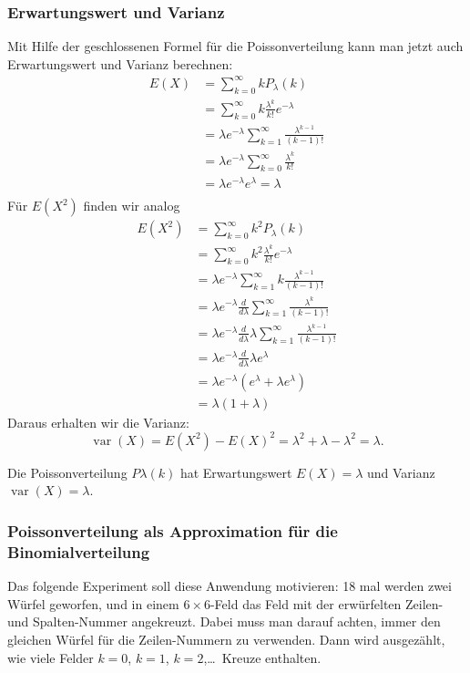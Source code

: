 \subsubsection{Erwartungswert und Varianz}
Mit Hilfe der geschlossenen Formel für die Poissonverteilung kann man
jetzt auch Erwartungswert und Varianz berechnen:
\begin{align*}
E(X)
&=\sum_{k=0}^\infty kP_\lambda(k)\\
&=\sum_{k=0}^\infty k\frac{\lambda^k}{k!}e^{-\lambda}\\
&=\lambda e^{-\lambda}\sum_{k=1}^\infty\frac{\lambda^{k-1}}{(k-1)!}\\
&=\lambda e^{-\lambda}\sum_{k=0}^\infty\frac{\lambda^k}{k!}\\
&=\lambda e^{-\lambda}e^\lambda=\lambda\\
\end{align*}
Für $E(X^2)$ finden wir analog
\begin{align*}
E(X^2)
&=\sum_{k=0}^\infty k^2P_\lambda(k)\\
&=\sum_{k=0}^\infty k^2\frac{\lambda^k}{k!}e^{-\lambda}\\
&=\lambda e^{-\lambda}\sum_{k=1}^\infty k\frac{\lambda^{k-1}}{(k-1)!}\\
&=\lambda e^{-\lambda}\frac{d}{d\lambda}\sum_{k=1}^\infty \frac{\lambda^k}{(k-1)!}\\
&=\lambda e^{-\lambda}\frac{d}{d\lambda}\lambda\sum_{k=1}^\infty \frac{\lambda^{k-1}}{(k-1)!}\\
&=\lambda e^{-\lambda}\frac{d}{d\lambda}\lambda e^{\lambda}\\
&=\lambda e^{-\lambda}(e^\lambda+\lambda e^\lambda)\\
&=\lambda(1+\lambda)
\end{align*}
Daraus erhalten wir die Varianz:
\[
\operatorname{var}(X)=E(X^2)-E(X)^2=\lambda^2+\lambda -\lambda^2 =\lambda.
\]
\begin{satz}
Die Poissonverteilung $P\lambda(k)$ hat Erwartungswert
$E(X)=\lambda$ und Varianz $\operatorname{var}(X)=\lambda$.
\end{satz}

\subsubsection{Poissonverteilung als Approximation für die Binomialverteilung}
Das folgende Experiment soll diese Anwendung motivieren: 18 mal werden zwei 
Würfel geworfen, und in einem $6\times 6$-Feld das Feld mit der
erwürfelten Zeilen- und Spalten-Nummer angekreuzt.
Dabei muss man darauf
achten, immer den gleichen Würfel für die Zeilen-Nummern zu verwenden.
Dann wird ausgezählt, wie viele Felder $k=0$, $k=1$, $k=2$,\dots\ Kreuze
enthalten.

